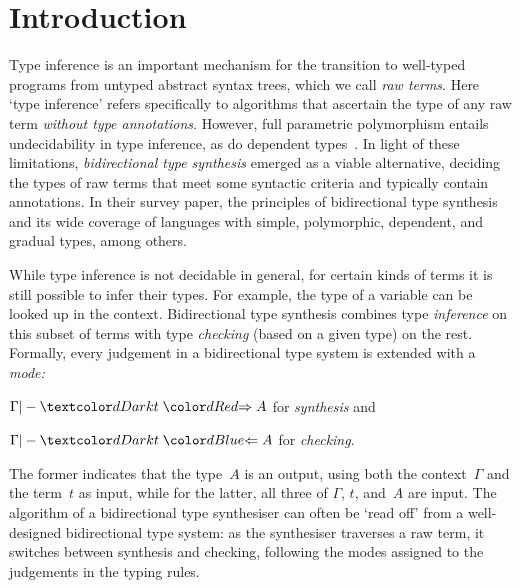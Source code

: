 
\section{Introduction}\label{sec:intro}

Type inference is an important mechanism for the transition to well-typed programs from untyped abstract syntax trees, which we call \emph{raw terms}.
Here `type inference' refers specifically to algorithms that ascertain the type of any raw term \emph{without type annotations}.
However, full parametric polymorphism entails undecidability in type inference, as do dependent types~\cite{Wells1999,Dowek1993}.
In light of these limitations, \emph{bidirectional type synthesis} emerged as a viable alternative, deciding the types of raw terms that meet some syntactic criteria and typically contain annotations.
In their survey paper,  the principles of bidirectional type synthesis and its wide coverage of languages with simple, polymorphic, dependent, and gradual types, among others.

While type inference is not decidable in general, for certain kinds of terms it is still possible to infer their types.
For example, the type of a variable can be looked up in the context.
Bidirectional type synthesis combines type \emph{inference} on this subset of terms with type \emph{checking} (based on a given type) on the rest.
Formally, every judgement in a bidirectional type system is extended with a \emph{mode:}
\begin{inlineenum}
  \item $\Gamma |- \isTerm{t} \syn A$ for \emph{synthesis} and 
  \item $\Gamma |- \isTerm{t} \chk A$ for \emph{checking}.
\end{inlineenum}
The former indicates that the type~$A$ is an output, using both the context~$\Gamma$ and the term~$t$ as input, while for the latter, all three of $\Gamma$, $t$, and~$A$ are input.
The algorithm of a bidirectional type synthesiser can often be `read off' from a well-designed bidirectional type system: as the synthesiser traverses a raw term, it switches between synthesis and checking, following the modes assigned to the judgements in the typing rules.

